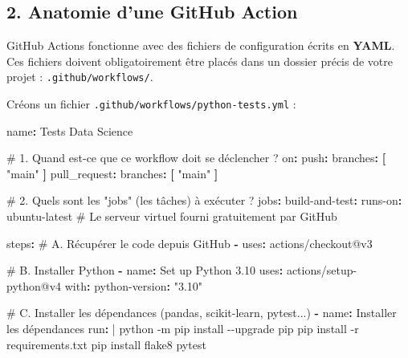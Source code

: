 \documentclass[
  letterpaper,
  DIV=11,
  numbers=noendperiod]{scrreprt}
\newenvironment{Shaded}{\begin{snugshade}}{\end{snugshade}}
\newcommand{\AttributeTok}[1]{\textcolor[rgb]{0.40,0.45,0.13}{#1}}
\newcommand{\CharTok}[1]{\textcolor[rgb]{0.13,0.47,0.30}{#1}}
\newcommand{\CommentTok}[1]{\textcolor[rgb]{0.37,0.37,0.37}{#1}}
\newcommand{\FunctionTok}[1]{\textcolor[rgb]{0.28,0.35,0.67}{#1}}
\newcommand{\KeywordTok}[1]{\textcolor[rgb]{0.00,0.23,0.31}{\textbf{#1}}}
\newcommand{\NormalTok}[1]{\textcolor[rgb]{0.00,0.23,0.31}{#1}}
\newcommand{\StringTok}[1]{\textcolor[rgb]{0.13,0.47,0.30}{#1}}
\begin{document}
\subsection{2. Anatomie d'une GitHub
Action}\label{anatomie-dune-github-action}

GitHub Actions fonctionne avec des fichiers de configuration écrits en
\textbf{YAML}. Ces fichiers doivent obligatoirement être placés dans un
dossier précis de votre projet : \texttt{.github/workflows/}.

Créons un fichier \texttt{.github/workflows/python-tests.yml} :

\begin{Shaded}
\begin{Highlighting}[]
\FunctionTok{name}\KeywordTok{:}\AttributeTok{ Tests Data Science}

\CommentTok{\# 1. Quand est{-}ce que ce workflow doit se déclencher ?}
\FunctionTok{on}\KeywordTok{:}
\AttributeTok{  }\FunctionTok{push}\KeywordTok{:}
\AttributeTok{    }\FunctionTok{branches}\KeywordTok{:}\AttributeTok{ }\KeywordTok{[}\AttributeTok{ }\StringTok{"main"}\AttributeTok{ }\KeywordTok{]}
\AttributeTok{  }\FunctionTok{pull\_request}\KeywordTok{:}
\AttributeTok{    }\FunctionTok{branches}\KeywordTok{:}\AttributeTok{ }\KeywordTok{[}\AttributeTok{ }\StringTok{"main"}\AttributeTok{ }\KeywordTok{]}

\CommentTok{\# 2. Quels sont les "jobs" (les tâches) à exécuter ?}
\FunctionTok{jobs}\KeywordTok{:}
\AttributeTok{  }\FunctionTok{build{-}and{-}test}\KeywordTok{:}
\AttributeTok{    }\FunctionTok{runs{-}on}\KeywordTok{:}\AttributeTok{ ubuntu{-}latest}\CommentTok{ \# Le serveur virtuel fourni gratuitement par GitHub}

\AttributeTok{    }\FunctionTok{steps}\KeywordTok{:}
\CommentTok{    \# A. Récupérer le code depuis GitHub}
\AttributeTok{    }\KeywordTok{{-}}\AttributeTok{ }\FunctionTok{uses}\KeywordTok{:}\AttributeTok{ actions/checkout@v3}

\CommentTok{    \# B. Installer Python}
\AttributeTok{    }\KeywordTok{{-}}\AttributeTok{ }\FunctionTok{name}\KeywordTok{:}\AttributeTok{ Set up Python 3.10}
\AttributeTok{      }\FunctionTok{uses}\KeywordTok{:}\AttributeTok{ actions/setup{-}python@v4}
\AttributeTok{      }\FunctionTok{with}\KeywordTok{:}
\AttributeTok{        }\FunctionTok{python{-}version}\KeywordTok{:}\AttributeTok{ }\StringTok{"3.10"}

\CommentTok{    \# C. Installer les dépendances (pandas, scikit{-}learn, pytest...)}
\AttributeTok{    }\KeywordTok{{-}}\AttributeTok{ }\FunctionTok{name}\KeywordTok{:}\AttributeTok{ Installer les dépendances}
\FunctionTok{      run}\KeywordTok{: }\CharTok{|}
\NormalTok{        python {-}m pip install {-}{-}upgrade pip}
\NormalTok{        pip install {-}r requirements.txt}
\NormalTok{        pip install flake8 pytest}


\end{Highlighting}
\end{Shaded}
\end{document}
